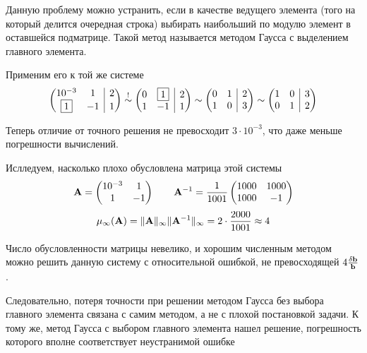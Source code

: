 \documentclass[professionalfonts,compress,unicode]{beamer}
\begin{document}
{
	Данную проблему можно устранить, если в качестве ведущего элемента (того на который делится очередная строка)
	выбирать наибольший по модулю элемент в оставшейся подматрице. Такой метод называется методом Гаусса с выделением главного элемента.
	
	Применим его к той же системе
	$$
	\left(
	\begin{array}{@{}cc|c@{}}
		10^{-3}&1&2\\
		\fbox{1}&-1&1
	\end{array}
	\right)
	\stackrel{!}{\sim}
	\left(
	\begin{array}{@{}cc|c@{}}
		0&\fbox{1}&2\\
		1&-1&1\\
	\end{array}
	\right)
	\sim
	\left(
	\begin{array}{@{}cc|c@{}}
		0&1&2\\
		1&0&3\\	
	\end{array}
	\right)
	\sim
	\left(
	\begin{array}{@{}cc|c@{}}
		1&0&3\\	
		0&1&2\\
	\end{array}
	\right)
$$

	Теперь отличие от точного решения не превосходит $3 \cdot 10^{-3}$, что даже меньше погрешности вычислений.
}

{
	Ислледуем, насколько плохо обусловлена матрица этой системы
	$$
	{\bf A}=\begin{pmatrix}
		10^{-3}&1\\
		1&-1
	\end{pmatrix}
	\qquad
	{\bf A}^{-1}=\frac{1}{1001}\begin{pmatrix}
		1000&1000\\
		1000&-1
	\end{pmatrix}	
	$$
	\pause
	$$
	\mu_\infty({\bf A}) = \|{\bf A}\|_\infty\|{\bf A}^{-1}\|_\infty = 2 \cdot \frac{2000}{1001} \approx 4
	$$
	
	Число обусловленности матрицы невелико, и хорошим численным методом можно решить данную систему с относительной ошибкой,
	не превосходящей $4 \frac{\delta {\bf b}}{{\bf b}}$. 
	
	Следовательно, потеря точности при решении методом Гаусса без выбора главного элемента связана 
	с самим методом, а не с плохой постановкой задачи. К тому же, метод Гаусса с выбором главного
	элемента нашел решение, погрешность которого вполне соответствует неустранимой ошибке
}
\end{document}
